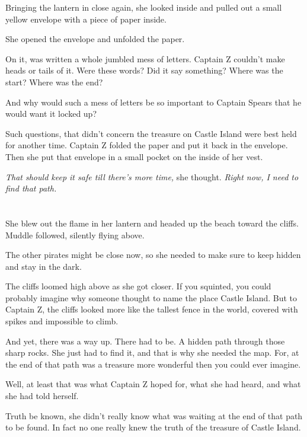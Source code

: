 \documentclass[12pt]{extbook}
\begin{document}
  Bringing the lantern in close again, she looked inside and pulled out a
  small yellow envelope with a piece of paper inside.
  
  She opened the envelope and unfolded the paper.
  
  On it, was written a whole jumbled mess of letters. Captain Z couldn't
  make heads or tails of it. Were these words? Did it say something? Where
  was the start? Where was the end?
  
  And why would such a mess of letters be so important to Captain Spears
  that he would want it locked up?
  
  Such questions, that didn't concern the treasure on Castle Island were
  best held for another time. Captain Z folded the paper and put it back
  in the envelope. Then she put that envelope in a small pocket on the
  inside of her vest.
  
  \emph{That should keep it safe till there's more time,} she thought.
  \emph{Right now, I need to find that path.}
  
  \section{}\label{section-12}
  
  She blew out the flame in her lantern and headed up the beach toward the
  cliffs. Muddle followed, silently flying above.
  
  The other pirates might be close now, so she needed to make sure to keep
  hidden and stay in the dark.
  
  The cliffs loomed high above as she got closer. If you squinted, you
  could probably imagine why someone thought to name the place Castle
  Island. But to Captain Z, the cliffs looked more like the tallest fence
  in the world, covered with spikes and impossible to climb.
  
  And yet, there was a way up. There had to be. A hidden path through
  those sharp rocks. She just had to find it, and that is why she needed
  the map. For, at the end of that path was a treasure more wonderful then
  you could ever imagine.
  
  Well, at least that was what Captain Z hoped for, what she had heard,
  and what she had told herself.
  
  Truth be known, she didn't really know what was waiting at the end of
  that path to be found. In fact no one really knew the truth of the
  treasure of Castle Island.
  
\end{document}
